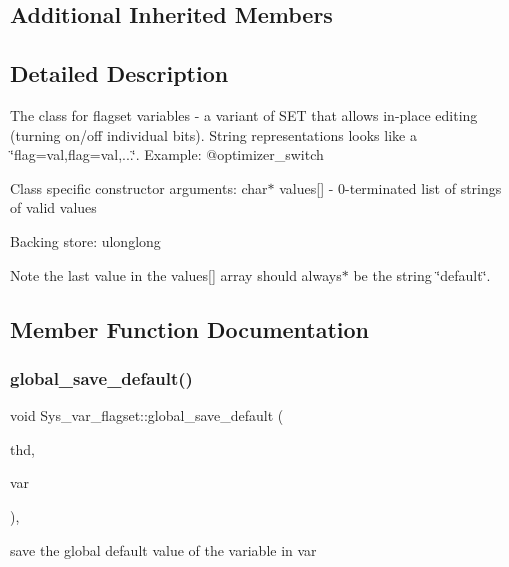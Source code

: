 \subsection*{Additional Inherited Members}


\subsection{Detailed Description}
The class for flagset variables -\/ a variant of S\+ET that allows in-\/place editing (turning on/off individual bits). String representations looks like a \char`\"{}flag=val,flag=val,...\char`\"{}. Example\+: @optimizer\+\_\+switch

Class specific constructor arguments\+: char$\ast$ values\mbox{[}\mbox{]} -\/ 0-\/terminated list of strings of valid values

Backing store\+: ulonglong

\begin{DoxyNote}{Note}
the last value in the values\mbox{[}\mbox{]} array should always$\ast$ be the string \char`\"{}default\char`\"{}. 
\end{DoxyNote}


\subsection{Member Function Documentation}
\mbox{\label{classSys__var__flagset_a4c691624d5e68bde8e46b18fa45eee42}} 
\subsubsection{\texorpdfstring{global\+\_\+save\+\_\+default()}{global\_save\_default()}}
{\footnotesize\ttfamily void Sys\+\_\+var\+\_\+flagset\+::global\+\_\+save\+\_\+default (\begin{DoxyParamCaption}\item[{T\+HD $\ast$}]{thd,  }\item[{\mbox{\hyperlink{classset__var}{set\+\_\+var}} $\ast$}]{var }\end{DoxyParamCaption})\hspace{0.3cm}{\ttfamily [inline]}, {\ttfamily [virtual]}}

save the global default value of the variable in var 

